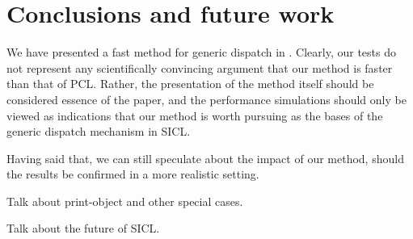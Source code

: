\section{Conclusions and future work}

We have presented a fast method for generic dispatch in \cl{}.
Clearly, our tests do not represent any scientifically convincing
argument that our method is faster than that of PCL.  Rather, the
presentation of the method itself should be considered essence of the
paper, and the performance simulations should only be viewed as
indications that our method is worth pursuing as the bases of the
generic dispatch mechanism in SICL. 

Having said that, we can still speculate about the impact of our
method, should the results be confirmed in a more realistic setting. 

Talk about print-object and other special cases.

Talk about the future of SICL.
 
